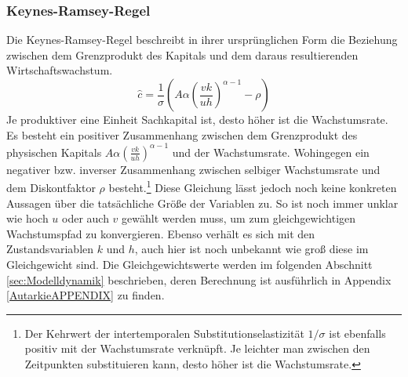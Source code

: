 \subsubsection*{Keynes-Ramsey-Regel}
Die Keynes-Ramsey-Regel beschreibt in ihrer ursprünglichen Form die Beziehung zwischen dem Grenzprodukt des Kapitals und dem daraus resultierenden Wirtschaftswachstum.  
%
\begin{equation}
	\boxed{\hat{c}=\frac{1}{\sigma}\left(A\alpha \left(\frac{vk}{uh}\right)^{\alpha -1}-\rho\right)}\label{KRRWM}
\end{equation}
%
Je produktiver eine Einheit Sachkapital ist, desto höher ist die Wachstumsrate. Es besteht ein positiver Zusammenhang zwischen dem Grenzprodukt des physischen Kapitals $A\alpha \left(\frac{vk}{uh}\right)^{\alpha -1}$ und der Wachstumsrate. Wohingegen ein negativer bzw. inverser Zusammenhang zwischen selbiger Wachstumsrate und dem Diskontfaktor $\rho$ besteht.\footnote{Der Kehrwert der intertemporalen Substitutionselastizität $1/\sigma$ ist ebenfalls positiv mit der Wachstumsrate verknüpft. Je leichter man zwischen den Zeitpunkten substituieren kann, desto höher ist die Wachstumsrate.} 
Diese Gleichung lässt jedoch noch keine konkreten Aussagen über die tatsächliche Größe der Variablen zu. So ist noch immer unklar wie hoch $u$ oder auch $v$ gewählt werden muss, um zum gleichgewichtigen Wachstumspfad zu konvergieren. Ebenso verhält es sich mit den Zustandsvariablen $k$ und $h$, auch hier ist noch unbekannt wie groß diese im Gleichgewicht sind. Die Gleichgewichtswerte werden im folgenden Abschnitt \ref{sec:Modelldynamik} beschrieben, deren Berechnung ist ausführlich in Appendix \ref{AutarkieAPPENDIX} zu finden. 
%
